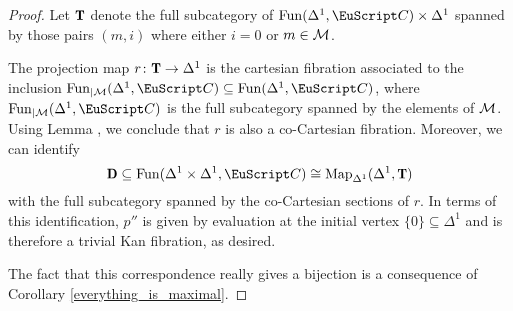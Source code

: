 \begin{proof}
Let $\T$ denote the full subcategory of $\Fun(\Delta^1,\iC)\times \Delta^1$ spanned by those pairs $(m, i)$ where either $i = 0$ or $m\in \mathcal{M}$. 

The projection map $r \colon \T\to \Delta^1$ is the cartesian fibration associated to the inclusion 
$\Fun_{|\M}(\Delta^1,\iC) \subseteq \Fun(\Delta^1,\iC)$, where $\Fun_{|\M}(\Delta^1,\iC)$ is the full subcategory spanned by the elements of $\mathcal{M}$.
Using Lemma , we conclude that $r$ is also a co-Cartesian fibration. Moreover, we can identify
\[\sD \subseteq \Fun(\Delta^1\times \Delta^1, \iC) \cong \mathrm{Map}_{\Delta^1} (\Delta^1, \T)\]
with the full subcategory spanned by the co-Cartesian sections of $r$. In terms of this identification, $p''$ is given by evaluation at the initial vertex $\{0\}\subseteq \Delta^1$ and is therefore a trivial Kan fibration, as desired.

The fact that this correspondence really gives a bijection is a consequence of Corollary \ref{everything_is_maximal}.
\end{proof}


